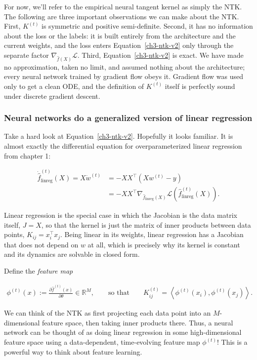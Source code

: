 For now, we'll refer to the empirical neural tangent kernel as simply the NTK.
The following are three important observations we can make about the NTK. 
First, $K^{(t)}$ is symmetric and positive semi-definite. 
Second, it has no information about the loss or the labels: it is built
entirely from the architecture and the current weights, and the loss enters
Equation~\eqref{ch3-ntk-v2} only through the separate factor $\nabla_{\hat{f}(X)}\mathcal{L}$. Third,
Equation~\eqref{ch3-ntk-v2} is exact. We have made no approximation, taken no limit, and assumed
nothing about the architecture; every neural network trained by gradient flow obeys it. Gradient
flow was used only to get a clean ODE, and the definition of $K^{(t)}$ itself is perfectly sound
under discrete gradient descent.

\subsubsection{Neural networks do a generalized version of linear regression}
\label{nn-lr}

Take a hard look at Equation~\eqref{ch3-ntk-v2}. Hopefully it looks familiar. It is almost exactly the
differential equation for overparameterized linear regression from chapter 1:

\begin{align}
\dot{\hat{f}}^{(t)}_{\text{linreg}}(X) = X\dot{w}^{(t)}
&= - X X^\top\left(Xw^{(t)}-y\right) \\
&= - X X^\top \nabla_{\hat{f}_{\text{linreg}}(X)}
\mathcal{L}\left(\hat{f}_{\text{linreg}}^{(t)}(X)\right).
\end{align}

Linear regression is the special case in which the Jacobian is the data matrix itself, $J = X$, so
that the kernel is just the matrix of inner products between data points,
$K_{ij} = x^\top_i x_j$. Being linear in its weights, linear regression has a Jacobian that does not
depend on $w$ at all, which is precisely why its kernel is constant and its dynamics are solvable in
closed form.

Define the \textit{feature map}

\begin{align}
\phi^{(t)}(x) := \frac{\partial \hat{f}^{(t)}(x)}{\partial \theta} \in \mathbb{R}^M,
\qquad\text{so that}\qquad
K^{(t)}_{ij} = \left\langle \phi^{(t)}(x_i), \phi^{(t)}(x_j)\right\rangle.
\end{align}

We can think of the NTK as first projecting each data point into an $M$-dimensional feature space, then taking inner
products there. Thus, a neural network can be thought of as doing linear regression in some high-dimensional
feature space using a data-dependent, time-evolving feature map $\phi^{(t)}$!
This is a powerful way to think about feature learning.

